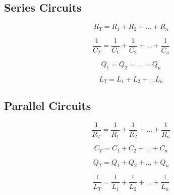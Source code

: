 \documentclass[twocolumn, 12pt]{article}
\begin{document}
\subsection*{Series Circuits}
\begin{equation*}
    R_T = R_1 + R_2+ \dotsc +R_n
\end{equation*}

\begin{equation*}
    \frac{1}{C_T} = \frac{1}{C_1} + \frac{1}{C_2}+\dotsc+\frac{1}{C_n}
\end{equation*}

\begin{equation*}
    Q_1 = Q_2 = \dotsc = Q_n
\end{equation*}

\begin{equation*}
    L_T = L_1 + L_2 + \dotsc L_n
\end{equation*}





\subsection*{Parallel Circuits}
\begin{equation*}
    \frac{1}{R_T} = \frac{1}{R_1} + \frac{1}{R_2} + \dotsc + \frac{1}{R_n}
\end{equation*}

\begin{equation*}
    C_T = C_1 + C_2 + \dotsc +C_n
\end{equation*}

\begin{equation*}
    Q_T = Q_1 + Q_2 +\dotsc + Q_n
\end{equation*}

\begin{equation*}
    \frac{1}{L_T} = \frac{1}{L_1} + \frac{1}{L_2} + \dotsc + \frac{1}{L_n}
\end{equation*}
\end{document}
